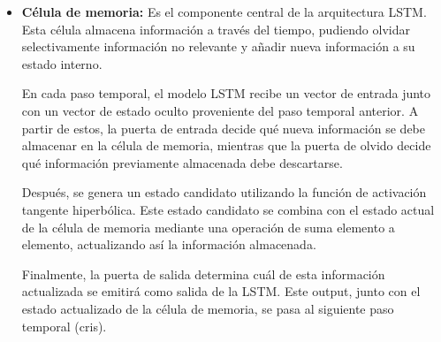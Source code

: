 \begin{itemize}
    \item \textbf{Célula de memoria:} Es el componente central de la arquitectura LSTM. Esta célula almacena información a través del tiempo, pudiendo olvidar selectivamente información no relevante y añadir nueva información a su estado interno.

    En cada paso temporal, el modelo LSTM recibe un vector de entrada junto con un vector de estado oculto proveniente del paso temporal anterior. A partir de estos, la puerta de entrada decide qué nueva información se debe almacenar en la célula de memoria, mientras que la puerta de olvido decide qué información previamente almacenada debe descartarse.
    
    Después, se genera un estado candidato utilizando la función de activación tangente hiperbólica. Este estado candidato se combina con el estado actual de la célula de memoria mediante una operación de suma elemento a elemento, actualizando así la información almacenada.
    
    Finalmente, la puerta de salida determina cuál de esta información actualizada se emitirá como salida de la LSTM. Este output, junto con el estado actualizado de la célula de memoria, se pasa al siguiente paso temporal (cris).
    
\end{itemize}

